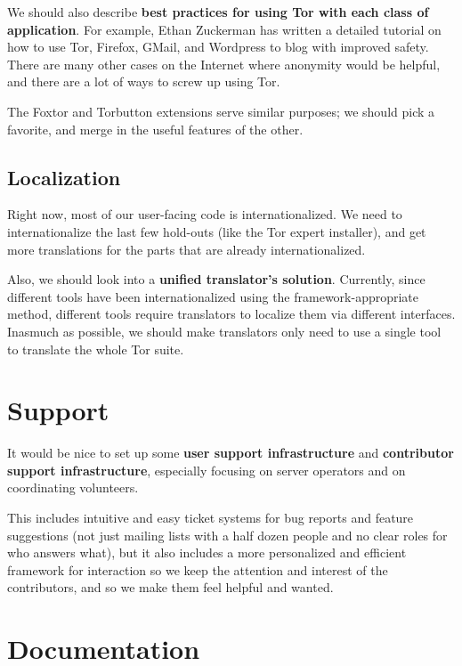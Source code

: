 \documentclass{article}
\newcommand{\tmp}[1]{{\bf #1} [......] \\}
\begin{document}
We should also describe {\bf best practices for using Tor with each class of
  application}. For example, Ethan Zuckerman has written a detailed
tutorial on how to use Tor, Firefox, GMail, and Wordpress to blog with
improved safety. There are many other cases on the Internet where anonymity
would be helpful, and there are a lot of ways to screw up using Tor.

The Foxtor and Torbutton extensions serve similar purposes; we should pick a
favorite, and merge in the useful features of the other.

%

\subsection{Localization}
Right now, most of our user-facing code is internationalized.  We need to
internationalize the last few hold-outs (like the Tor expert installer), and get
more translations for the parts that are already internationalized.

Also, we should look into a {\bf unified translator's solution}.  Currently,
since different tools have been internationalized using the
framework-appropriate method, different tools require translators to localize
them via different interfaces.  Inasmuch as possible, we should make
translators only need to use a single tool to translate the whole Tor suite.

\section{Support}

It would be nice to set up some {\bf user support infrastructure} and
{\bf contributor support infrastructure}, especially focusing on server
operators and on coordinating volunteers.

This includes intuitive and easy ticket systems for bug reports and
feature suggestions (not just mailing lists with a half dozen people
and no clear roles for who answers what), but it also includes a more
personalized and efficient framework for interaction so we keep the
attention and interest of the contributors, and so we make them feel
helpful and wanted.

\section{Documentation}
\end{document}
